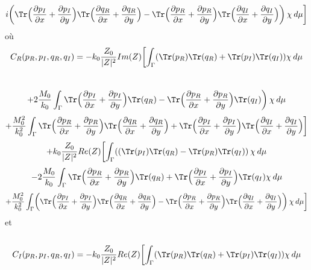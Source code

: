 \[i\biggl(\Tr \Bigl( \frac{\partial p_I}{\partial x}+\frac{\partial p_I}{\partial y}\Bigr)\Tr\Bigl( \frac{\partial q_R}{\partial x}+\frac{\partial q_R}{\partial y}\Bigr) - \Tr \Bigl( \frac{\partial p_R}{\partial x}+\frac{\partial p_R}{\partial y}\Bigr)\Tr\Bigl( \frac{\partial q_I}{\partial x}+\frac{\partial q_I}{\partial y}\Bigr) \biggl) \hspace{2pt} \chi  \hspace{2pt} d\mu \biggl]\]
où\\
\[
C_R(p_R,p_I,q_R,q_I) = -k_0\frac{Z_0}{|Z|^2} Im(Z) \biggl[ \int_{\Gamma} ( \Tr(p_R) \Tr(q_R) + \Tr(p_I) \Tr(q_I))\chi \hspace{2pt} d\mu  \]\
\[
+ 2 \frac{M_0}{k_0} \int_{\Gamma}   \Tr \Bigl( \frac{\partial p_I}{\partial x}+\frac{\partial p_I}{\partial y} \Bigr) \Tr(q_R) - \Tr \Bigl( \frac{\partial p_R}{\partial x}+\frac{\partial p_R}{\partial y} \Bigr) \Tr(q_I) \biggl)\hspace{2pt} \chi \hspace{2pt} d\mu 
\]
\[
+ \frac{M_0^2}{k_0^2}\int_{\Gamma} \Tr \Bigl( \frac{\partial p_R}{\partial x}+\frac{\partial p_R}{\partial y}\Bigr)\Tr\Bigl( \frac{\partial q_R}{\partial x}+\frac{\partial q_R}{\partial y}\Bigr) + \Tr \Bigl( \frac{\partial p_I}{\partial x}+\frac{\partial p_I}{\partial y}\Bigr)\Tr\Bigl( \frac{\partial q_I}{\partial x}+\frac{\partial q_I}{\partial y}\Bigr) \biggl]  \]
\[
+ k_0\frac{Z_0}{|Z|^2}Re(Z)\biggl[ \int_{\Gamma} ( ( \Tr(p_I) \Tr(q_R) - \Tr(p_R) \Tr(q_I)) \hspace{2pt} \chi \hspace{2pt} d\mu \]
\[
- 2\frac{M_0}{k_0} \int_{\Gamma} \Tr \Bigl( \frac{\partial p_R}{\partial x}+\frac{\partial p_R}{\partial y} \Bigr) \Tr(q_R) + \Tr \Bigl( \frac{\partial p_I}{\partial x}+\frac{\partial p_I}{\partial y} \Bigr) \Tr(q_I) \chi \hspace{2pt} d\mu 
\]
\[
+ \frac{M_0^2}{k_0^2}\int_{\Gamma}
\biggl(\Tr \Bigl( \frac{\partial p_I}{\partial x}+\frac{\partial p_I}{\partial y}\Bigr)\Tr\Bigl( \frac{\partial q_R}{\partial x}+\frac{\partial q_R}{\partial y}\Bigr) - \Tr \Bigl( \frac{\partial p_R}{\partial x}+\frac{\partial p_R}{\partial y}\Bigr)\Tr\Bigl( \frac{\partial q_I}{\partial x}+\frac{\partial q_I}{\partial y}\Bigr) \biggl) \hspace{2pt} \chi  \hspace{2pt} d\mu \biggl]\]
et\\ \\
\[
C_I(p_R,p_I,q_R,q_I) = -k_0\frac{Z_0}{|Z|^2} Re(Z) \biggl[ \int_{\Gamma} ( \Tr(p_R) \Tr(q_R) + \Tr(p_I) \Tr(q_I))\chi \hspace{2pt} d\mu  \]\
